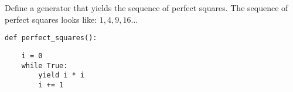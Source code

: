 \question Define a generator that yields the sequence of perfect squares. The
sequence of perfect squares looks like: $1, 4, 9, 16 \ldots$
\begin{lstlisting}
def perfect_squares():
\end{lstlisting}

\begin{solution}[1in]
\begin{lstlisting}
    i = 0
    while True:
        yield i * i
        i += 1
\end{lstlisting}
\end{solution}
